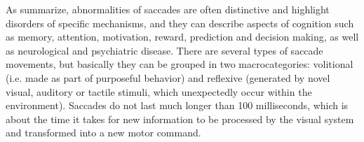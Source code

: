 \newline



As \citet[pp. 170-171]{leigh2015neurology} summarize, abnormalities of saccades are often distinctive and highlight disorders of specific mechanisms, and they can describe aspects of cognition such as memory, attention, motivation, reward, prediction and decision making, as well as neurological and psychiatric disease. There are several types of saccade movements, but basically they can be grouped in two macrocategories: volitional (i.e. made as part of purposeful behavior) and reflexive (generated by novel visual, auditory or tactile stimuli, which unexpectedly occur within the environment). Saccades do not last much longer than 100 milliseconds, which is about the time it takes for new information to be processed by the visual system and transformed into a new motor command.

